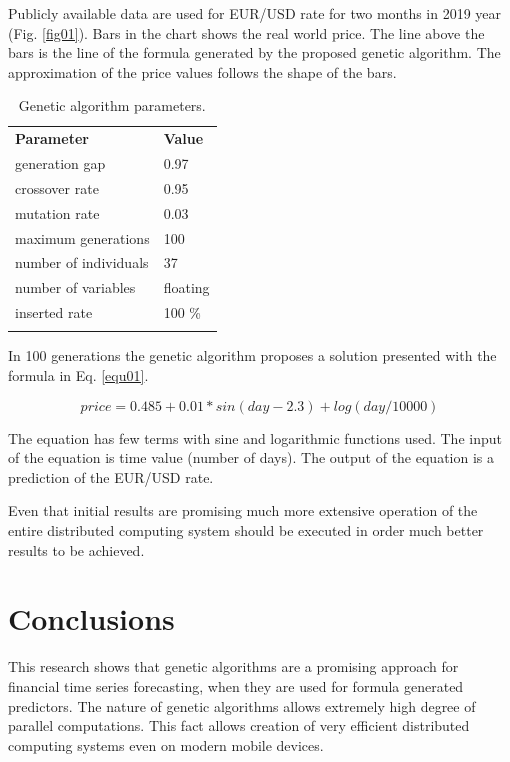 \documentclass[graybox]{svmult}
\begin{document}
Publicly available data are used for EUR/USD rate for two months in 2019 year (Fig. \ref{fig01}). Bars in the chart shows the real world price. The line above the bars is the line of the formula generated by the proposed genetic algorithm. The approximation of the price values follows the shape of the bars. 

\begin{table}
\caption{Genetic algorithm parameters.}
\label{tab01}
\begin{tabular}{p{6.9cm}p{4.4cm}}
\hline\noalign{\smallskip}
\textbf{Parameter} & \textbf{Value} \\
\noalign{\smallskip}\svhline\noalign{\smallskip}
generation gap & 0.97 \\
crossover rate & 0.95 \\
mutation rate & 0.03 \\
maximum generations & 100 \\
number of individuals & 37 \\
number of variables & floating \\
inserted rate & 100 \% \\
\noalign{\smallskip}\hline\noalign{\smallskip}
\end{tabular}
\end{table}
\FloatBarrier

In 100 generations the genetic algorithm proposes a solution presented with the formula in Eq. \ref{equ01}.

\begin{equation}\label{equ01}
price = 0.485 + 0.01 * sin(day - 2.3) + log(day / 10000)
\end{equation}

The equation has few terms with sine and logarithmic functions used. The input of the equation is time value (number of days). The output of the equation is a prediction of the EUR/USD rate. 

Even that initial results are promising much more extensive operation of the entire distributed computing system should be executed in order much better results to be achieved. 

\section{Conclusions} \label{Conclusions}

This research shows that genetic algorithms are a promising approach for financial time series forecasting, when they are used for formula generated predictors. The nature of genetic algorithms allows extremely high degree of parallel computations. This fact allows creation of very efficient distributed computing systems even on modern mobile devices. 
\end{document}
